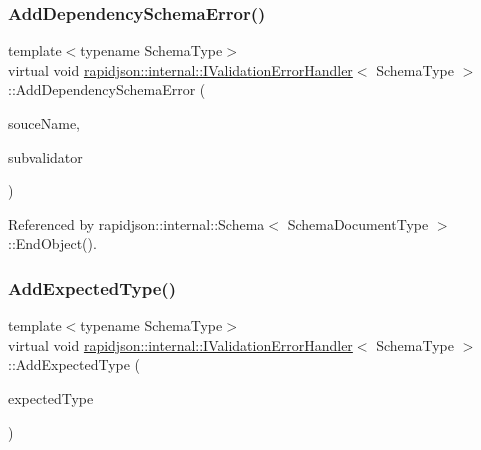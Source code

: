 \subsubsection{\texorpdfstring{AddDependencySchemaError()}{AddDependencySchemaError()}}
{\footnotesize\ttfamily template$<$typename Schema\+Type$>$ \\
virtual void \mbox{\hyperlink{classrapidjson_1_1internal_1_1_i_validation_error_handler}{rapidjson\+::internal\+::\+I\+Validation\+Error\+Handler}}$<$ Schema\+Type $>$\+::Add\+Dependency\+Schema\+Error (\begin{DoxyParamCaption}\item[{const \mbox{\hyperlink{classrapidjson_1_1internal_1_1_i_validation_error_handler_a8a2aaf7eb28a3ce7ed81689141f3af1f}{S\+Value}} \&}]{souce\+Name,  }\item[{\mbox{\hyperlink{classrapidjson_1_1internal_1_1_i_schema_validator}{I\+Schema\+Validator}} $\ast$}]{subvalidator }\end{DoxyParamCaption})\hspace{0.3cm}{\ttfamily [pure virtual]}}



Referenced by rapidjson\+::internal\+::\+Schema$<$ Schema\+Document\+Type $>$\+::\+End\+Object().

\mbox{\label{classrapidjson_1_1internal_1_1_i_validation_error_handler_a64fb41ff4166ee7ab77b5d874b41ab0a}} 
\subsubsection{\texorpdfstring{AddExpectedType()}{AddExpectedType()}}
{\footnotesize\ttfamily template$<$typename Schema\+Type$>$ \\
virtual void \mbox{\hyperlink{classrapidjson_1_1internal_1_1_i_validation_error_handler}{rapidjson\+::internal\+::\+I\+Validation\+Error\+Handler}}$<$ Schema\+Type $>$\+::Add\+Expected\+Type (\begin{DoxyParamCaption}\item[{const typename Schema\+Type\+::\+Value\+Type \&}]{expected\+Type }\end{DoxyParamCaption})\hspace{0.3cm}{\ttfamily [pure virtual]}}



